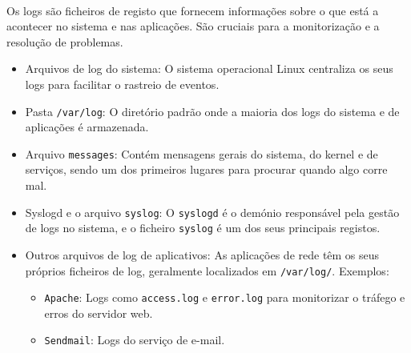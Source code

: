 \documentclass[10pt,a4paper]{article}
\begin{document}
		\paragraph{}
		Os logs são ficheiros de registo que fornecem informações sobre o que está a acontecer no sistema e nas aplicações. São cruciais para a monitorização e a resolução de problemas.
		
		\begin{itemize}
			\item Arquivos de log do sistema: O sistema operacional Linux centraliza os seus logs para facilitar o rastreio de eventos.
			\item Pasta \texttt{/var/log}: O diretório padrão onde a maioria dos logs do sistema e de aplicações é armazenada.
			\item Arquivo \texttt{messages}: Contém mensagens gerais do sistema, do kernel e de serviços, sendo um dos primeiros lugares para procurar quando algo corre mal.
			\item Syslogd e o arquivo \texttt{syslog}: O \texttt{syslogd} é o demónio responsável pela gestão de logs no sistema, e o ficheiro \texttt{syslog} é um dos seus principais registos.
			\item Outros arquivos de log de aplicativos: As aplicações de rede têm os seus próprios ficheiros de log, geralmente localizados em \texttt{/var/log/}. Exemplos:
			\begin{itemize}
				\item \texttt{Apache}: Logs como \texttt{access.log} e \texttt{error.log} para monitorizar o tráfego e erros do servidor web.
				\item \texttt{Sendmail}: Logs do serviço de e-mail.
			\end{itemize}
		\end{itemize}
		
	
\end{document}
